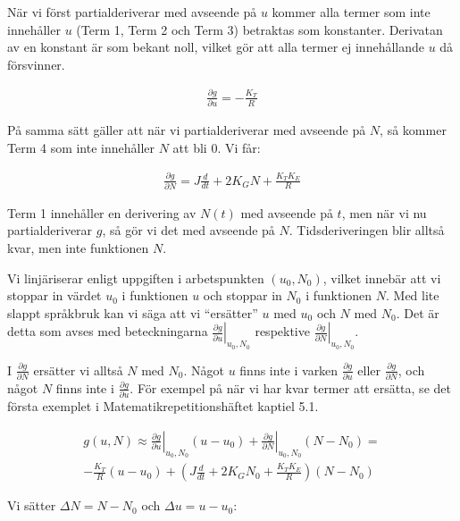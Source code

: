\documentclass[a4paper]{article}
\begin{document}
När vi först partialderiverar med avseende på $u$ kommer alla termer som inte innehåller $u$ (Term 1, Term 2 och Term 3) betraktas som konstanter. Derivatan av en konstant är som bekant noll, vilket gör att alla termer ej innehållande $u$ då försvinner.

\begin{align*}
  \frac{\partial g}{\partial u} = -\frac{K_T}{R}
\end{align*}

På samma sätt gäller att när vi partialderiverar med avseende på $N$, så kommer Term 4 som inte innehåller $N$ att bli 0. Vi får:

\begin{align*}
  \frac{\partial g}{\partial N} = J\frac{d}{dt} + 2K_G N + \frac{K_T K_E}{R}
\end{align*}

Term 1 innehåller en derivering av $N(t)$ med avseende på $t$, men när vi nu partialderiverar $g$, så gör vi det med avseende på $N$. Tidsderiveringen blir alltså kvar, men inte funktionen $N$.

Vi linjäriserar enligt uppgiften i arbetspunkten $(u_0, N_0)$, vilket innebär att vi stoppar in värdet $u_0$ i funktionen $u$ och stoppar in $N_0$ i funktionen $N$. Med lite slappt språkbruk kan vi säga att vi ``ersätter'' $u$ med $u_0$ och $N$ med $N_0$. Det är detta som avses med beteckningarna $\left. \frac{\partial g}{\partial u} \right|_{u_0, N_0}$ respektive $\left. \frac{\partial g}{\partial N} \right|_{u_0, N_0}$.

I $\frac{\partial g}{\partial N}$ ersätter vi alltså $N$ med $N_0$. Något $u$ finns inte i varken $\frac{\partial g}{\partial u}$ eller $\frac{\partial g}{\partial N}$, och något $N$ finns inte i $\frac{\partial g}{\partial u}$. För exempel på när vi har kvar termer att ersätta, se det första exemplet i Matematikrepetitionshäftet kaptiel 5.1.

\begin{align*}
  g(u, N) \approx \left. \frac{\partial g}{\partial u}\right|_{u_0, N_0}(u - u_0) + \left. \frac{\partial g}{\partial N}\right|_{u_0, N_0}(N - N_0) = \\
  -\frac{K_T}{R}(u - u_0) + \left(J\frac{d}{dt} + 2K_G N_0 + \frac{K_T K_E}{R} \right)(N - N_0)
\end{align*}

Vi sätter $\Delta N = N - N_0$ och $\Delta u = u - u_0$:
\end{document}
